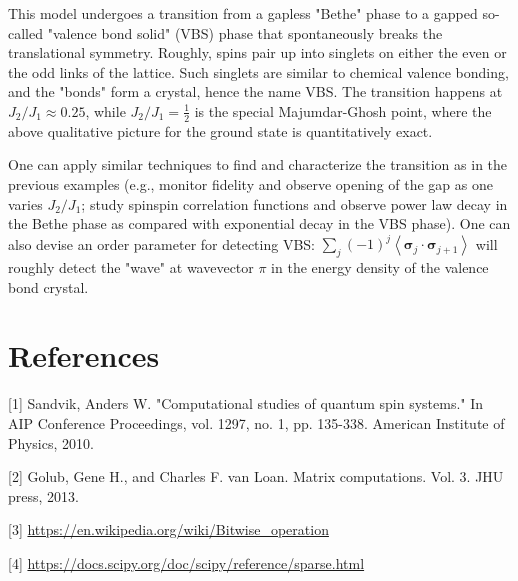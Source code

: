 \documentclass[10pt]{article}
\begin{document}
This model undergoes a transition from a gapless "Bethe" phase to a gapped so-called "valence bond solid" (VBS) phase that spontaneously breaks the translational symmetry. Roughly, spins pair up into singlets on either the even or the odd links of the lattice. Such singlets are similar to chemical valence bonding, and the "bonds" form a crystal, hence the name VBS. The transition happens at $J_{2} / J_{1} \approx 0.25$, while $J_{2} / J_{1}=\frac{1}{2}$ is the special Majumdar-Ghosh point, where the above qualitative picture for the ground state is quantitatively exact.

One can apply similar techniques to find and characterize the transition as in the previous examples (e.g., monitor fidelity and observe opening of the gap as one varies $J_{2} / J_{1}$; study spinspin correlation functions and observe power law decay in the Bethe phase as compared with exponential decay in the VBS phase). One can also devise an order parameter for detecting VBS: $\sum_{j}(-1)^{j}\left\langle\boldsymbol{\sigma}_{j} \cdot \boldsymbol{\sigma}_{j+1}\right\rangle$ will roughly detect the "wave" at wavevector $\pi$ in the energy density of the valence bond crystal.

\section*{References}
[1] Sandvik, Anders W. "Computational studies of quantum spin systems." In AIP Conference Proceedings, vol. 1297, no. 1, pp. 135-338. American Institute of Physics, 2010.

[2] Golub, Gene H., and Charles F. van Loan. Matrix computations. Vol. 3. JHU press, 2013.

[3] \href{https://en.wikipedia.org/wiki/Bitwise_operation}{https://en.wikipedia.org/wiki/Bitwise\_operation}

[4] \href{https://docs.scipy.org/doc/scipy/reference/sparse.html}{https://docs.scipy.org/doc/scipy/reference/sparse.html}
\end{document}
